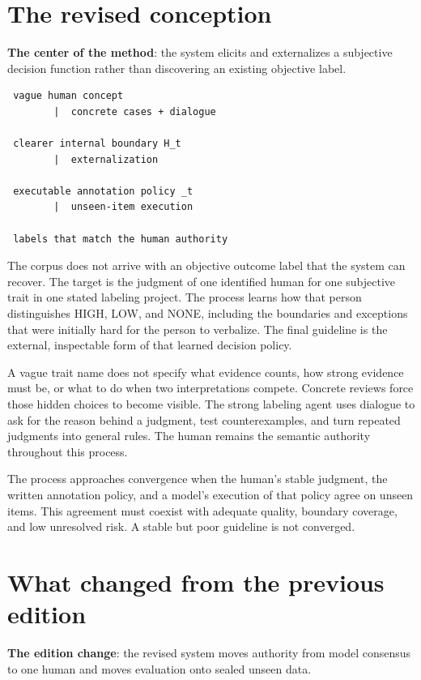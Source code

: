 
\section{The revised conception}
\textbf{The center of the method}: the system elicits and externalizes a subjective decision function rather than discovering an existing objective label.

\begin{verbatim}
 vague human concept
        |  concrete cases + dialogue

 clearer internal boundary H_t
        |  externalization

 executable annotation policy _t
        |  unseen-item execution

 labels that match the human authority
\end{verbatim}
The corpus does not arrive with an objective outcome label that the system can recover. The target is the judgment of one identified human for one subjective trait in one stated labeling project. The process learns how that person distinguishes HIGH, LOW, and NONE, including the boundaries and exceptions that were initially hard for the person to verbalize. The final guideline is the external, inspectable form of that learned decision policy.

A vague trait name does not specify what evidence counts, how strong evidence must be, or what to do when two interpretations compete. Concrete reviews force those hidden choices to become visible. The strong labeling agent uses dialogue to ask for the reason behind a judgment, test counterexamples, and turn repeated judgments into general rules. The human remains the semantic authority throughout this process.

The process approaches convergence when the human's stable judgment, the written annotation policy, and a model's execution of that policy agree on unseen items. This agreement must coexist with adequate quality, boundary coverage, and low unresolved risk. A stable but poor guideline is not converged.


\section{What changed from the previous edition}
\textbf{The edition change}: the revised system moves authority from model consensus to one human and moves evaluation onto sealed unseen data.


